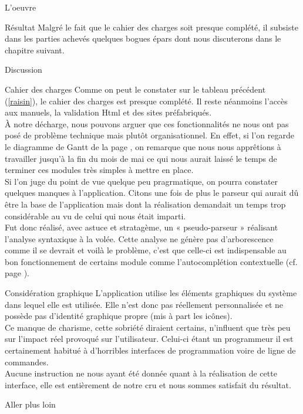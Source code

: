\documentclass[a4paper, 12pt]{report}
\begin{document}
\begin{part}{L'oeuvre}
\begin{chapter}{Résultat}
			Malgré le fait que le cahier des charges soit presque complété, il subsiste dans les parties achevés quelques \glspl{bogue} épars
			dont nous discuterons dans le chapitre suivant.
		\end{chapter}
		\begin{chapter}{Discussion}
			\begin{section}{Cahier des charges}
				Comme on peut le constater sur le tableau précédent (\ref{raisin}), le cahier des charges est presque complété.
				Il reste néanmoins l'accès aux manuels,	la validation \gls{Html} et des sites préfabriqués.\\
				À notre décharge, nous pouvons arguer que ces fonctionnalités ne nous ont pas posé de problème technique mais plutôt organisationnel.
				En effet, si l'on regarde le diagramme de Gantt de la page \pageref{flute}, on remarque que nous nous apprêtions à travailler
				jusqu'à la fin du mois de mai ce qui nous aurait laissé le temps de terminer ces modules très simples à mettre en place.\\


				Si l'on juge du point de vue quelque peu pragrmatique, on pourra constater quelques manques à l'application.
				Citons une fois de plus le \gls{parseur} qui aurait dû être la base de l'application mais dont la réalisation demandait
				un temps trop considérable au vu de	celui qui nous était imparti.\\
				Fut donc réalisé, avec astuce et stratagème, un « pseudo-parseur » réalisant l'analyse syntaxique à la volée. Cette analyse ne génère
				pas d'arborescence comme il se devrait et voilà le problème, c'est que celle-ci est indispensable au bon fonctionnement de certains
				module comme l'\gls{autocomplétion} contextuelle (cf. page \pageref{autocompl}).\\
			\end{section}

			\begin{section}{Considération graphique}
				L'application utilise les éléments graphiques du système dans lequel elle est utilisée. Elle n'est donc pas réellement personnalisée
				et ne possède pas d'identité graphique propre (mis à part les icônes).\\
				Ce manque de charisme, cette sobriété diraient certains, n'influent que très peu sur l'impact réel provoqué sur l'utilisateur.
				Celui-ci étant un programmeur il est certainement habitué à d'horribles interfaces de programmation voire de ligne de commandes.\\


				Aucune instruction ne nous ayant été donnée quant à la réalisation de cette interface, elle est entièrement de notre cru et
				nous sommes satisfait du résultat.
			\end{section}

			\begin{section}{Aller plus loin}
			\end{section}
		\end{chapter}
	\end{part}
\end{document}
